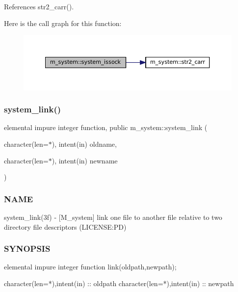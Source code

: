 References str2\+\_\+carr().

Here is the call graph for this function\+:\nopagebreak
\begin{figure}[H]
\begin{center}
\leavevmode
\includegraphics[width=350pt]{namespacem__system_af6eb5074fe74552bc7a5e7d00f459087_cgraph}
\end{center}
\end{figure}
\mbox{\label{namespacem__system_a0e04b5499fc3367eda9758b6e396a103}} 
\subsubsection{\texorpdfstring{system\+\_\+link()}{system\_link()}}
{\footnotesize\ttfamily elemental impure integer function, public m\+\_\+system\+::system\+\_\+link (\begin{DoxyParamCaption}\item[{character(len=$\ast$), intent(in)}]{oldname,  }\item[{character(len=$\ast$), intent(in)}]{newname }\end{DoxyParamCaption})}



\subsubsection*{N\+A\+ME}

system\+\_\+link(3f) -\/ \mbox{[}M\+\_\+system\mbox{]} link one file to another file relative to two directory file descriptors (L\+I\+C\+E\+N\+SE\+:PD) 

\subsubsection*{S\+Y\+N\+O\+P\+S\+IS}

\begin{DoxyVerb}elemental impure integer function link(oldpath,newpath);

 character(len=*),intent(in) :: oldpath
 character(len=*),intent(in) :: newpath
\end{DoxyVerb}



